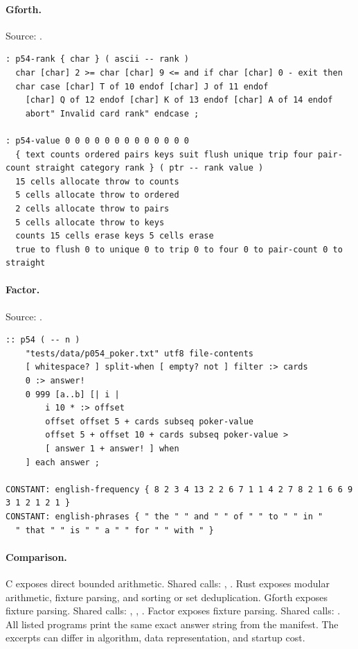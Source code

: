 \paragraph{Gforth.} Source: .
\begin{lstlisting}
: p54-rank { char } ( ascii -- rank )
  char [char] 2 >= char [char] 9 <= and if char [char] 0 - exit then
  char case [char] T of 10 endof [char] J of 11 endof
    [char] Q of 12 endof [char] K of 13 endof [char] A of 14 endof
    abort" Invalid card rank" endcase ;

: p54-value 0 0 0 0 0 0 0 0 0 0 0 0 0
  { text counts ordered pairs keys suit flush unique trip four pair-count straight category rank } ( ptr -- rank value )
  15 cells allocate throw to counts
  5 cells allocate throw to ordered
  2 cells allocate throw to pairs
  5 cells allocate throw to keys
  counts 15 cells erase keys 5 cells erase
  true to flush 0 to unique 0 to trip 0 to four 0 to pair-count 0 to straight
\end{lstlisting}

\paragraph{Factor.} Source: .
\begin{lstlisting}
:: p54 ( -- n )
    "tests/data/p054_poker.txt" utf8 file-contents
    [ whitespace? ] split-when [ empty? not ] filter :> cards
    0 :> answer!
    0 999 [a..b] [| i |
        i 10 * :> offset
        offset offset 5 + cards subseq poker-value
        offset 5 + offset 10 + cards subseq poker-value >
        [ answer 1 + answer! ] when
    ] each answer ;

CONSTANT: english-frequency { 8 2 3 4 13 2 2 6 7 1 1 4 2 7 8 2 1 6 6 9 3 1 2 1 2 1 }
CONSTANT: english-phrases { " the " " and " " of " " to " " in "
  " that " " is " " a " " for " " with " }
\end{lstlisting}

\paragraph{Comparison.}
C exposes direct bounded arithmetic. Shared calls: \texttt{}, \texttt{}. Rust exposes modular arithmetic, fixture parsing, and sorting or set deduplication. Gforth exposes fixture parsing. Shared calls: \texttt{}, \texttt{}, \texttt{}. Factor exposes fixture parsing. Shared calls: \texttt{}.
All listed programs print the same exact answer string from the manifest. The excerpts can differ in algorithm, data representation, and startup cost.

